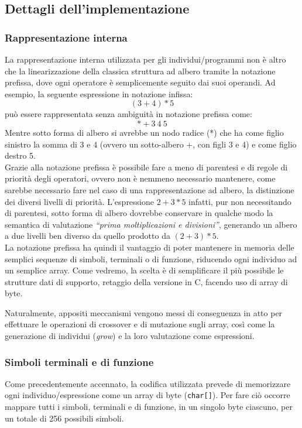 \documentclass{../llncs}
\begin{document}
\subsection{Dettagli dell'implementazione}
\subsubsection{Rappresentazione interna}
La rappresentazione interna utilizzata per gli individui/programmi non è altro che la linearizzazione della classica struttura ad albero tramite la notazione prefissa, dove ogni operatore è semplicemente seguito dai suoi operandi.
Ad esempio, la seguente espressione in notazione infissa:
\[
(3+4)*5
\]
può essere rappresentata senza ambiguità in notazione prefissa come:
\[
* + 3\:4\:5
\]
Mentre sotto forma di albero si avrebbe un nodo radice (*) che ha come figlio sinistro la somma di 3 e 4 (ovvero un sotto-albero $+$, con figli 3 e 4) e come figlio destro 5.\\

Grazie alla notazione prefissa è possibile fare a meno di parentesi e di regole di priorità degli operatori, ovvero non è nemmeno necessario mantenere, come sarebbe necessario fare nel caso di una rappresentazione ad albero, la distinzione dei diversi livelli di priorità. L'espressione $2+3*5$ infatti, pur non necessitando di parentesi, sotto forma di albero dovrebbe conservare in qualche modo la semantica di valutazione \textit{``prima moltiplicazioni e divisioni''}, generando un albero a due livelli ben diverso da quello prodotto da $(2+3)*5$.\\

La notazione prefissa ha quindi il vantaggio di poter mantenere in memoria delle semplici sequenze di simboli, terminali o di funzione, riducendo ogni individuo ad un semplice array. Come vedremo, la scelta è di semplificare il più possibile le strutture dati di supporto, retaggio della versione in C, facendo uso di array di byte.

Naturalmente, appositi meccanismi vengono messi di conseguenza in atto per effettuare le operazioni di crossover e di mutazione sugli array, così come la generazione di individui (\emph{grow}) e la loro valutazione come espressioni.

\subsubsection{Simboli terminali e di funzione}
Come precedentemente accennato, la codifica utilizzata prevede di memorizzare ogni individuo/espressione come un array di byte (\texttt{char[]}). Per fare ciò occorre mappare tutti i simboli, terminali e di funzione, in un singolo byte ciascuno, per un totale di 256 possibili simboli.
\end{document}
